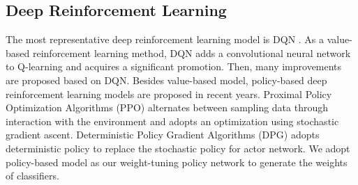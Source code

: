 \subsection{Deep Reinforcement Learning}
The most representative deep reinforcement learning model is DQN \cite{DBLP:journals/corr/MnihKSGAWR13}. As a value-based reinforcement learning method, DQN adds a convolutional neural network to Q-learning \cite{DBLP:journals/ml/WatkinsD92} and acquires a significant promotion. Then, many improvements \cite{DBLP:journals/nature/MnihKSRVBGRFOPB15, DBLP:conf/aaai/HasseltGS16} are proposed based on DQN. Besides value-based model, policy-based deep reinforcement learning models are proposed in recent years. Proximal Policy Optimization Algorithms (PPO) \cite{DBLP:journals/corr/SchulmanWDRK17} alternates between sampling data through interaction with the environment and adopts an optimization using stochastic gradient ascent. Deterministic Policy Gradient Algorithms (DPG) \cite{DBLP:conf/icml/SilverLHDWR14} adopts deterministic policy to replace the stochastic policy for actor network. We adopt policy-based model as our weight-tuning policy network to generate the weights of classifiers.